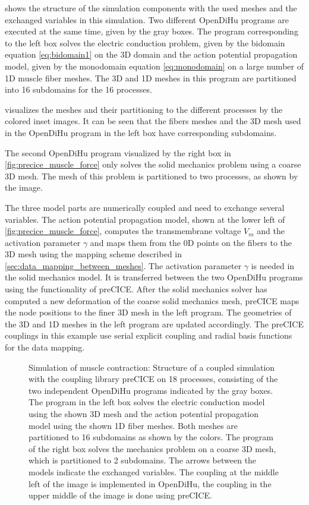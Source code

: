  shows the structure of the simulation components with the used meshes and the exchanged variables in this simulation. Two different OpenDiHu programs are executed at the same time, given by the gray boxes. The program corresponding to the left box solves the electric conduction problem, given by the bidomain equation \cref{eq:bidomain1} on the 3D domain and the action potential propagation model, given by the monodomain equation \cref{eq:monodomain} on a large number of 1D muscle fiber meshes. 
The 3D and 1D meshes in this program are partitioned into 16 subdomains for the 16 processes.

 visualizes the meshes and their partitioning to the different processes by the colored inset images. It can be seen that the fibers meshes and the 3D mesh used in the OpenDiHu program in the left box have corresponding subdomains.

The second OpenDiHu program visualized by the right box in \cref{fig:precice_muscle_force} only solves the solid mechanics problem using a coarse 3D mesh. The mesh of this problem is partitioned to two processes, as shown by the image. 

The three model parts are numerically coupled and need to exchange several variables. The action potential propagation model, shown at the lower left of \cref{fig:precice_muscle_force}, computes the transmembrane voltage $V_m$ and the activation parameter $\gamma$ and maps them from the 0D points on the fibers to the 3D mesh using the mapping scheme described in \cref{sec:data_mapping_between_meshes}. The activation parameter $\gamma$ is needed in the solid mechanics model. It is transferred between the two OpenDiHu programs using the functionality of preCICE. After the solid mechanics solver has computed a new deformation of the coarse solid mechanics mesh, preCICE maps the node positions to the finer 3D mesh in the left program. The geometries of the 3D and 1D meshes in the left program are updated accordingly.
The preCICE couplings in this example use serial explicit coupling and radial basis functions for the data mapping.

\begin{figure}
  \centering%
  \def\svgwidth{0.9\textwidth}
  \caption{Simulation of muscle contraction: Structure of a coupled simulation with the coupling library preCICE on 18 processes, consisting of the two independent OpenDiHu programs indicated by the gray boxes. The program in the left box solves the electric conduction model using the shown 3D mesh and the action potential propagation model using the shown 1D fiber meshes. Both meshes are partitioned to 16 subdomains as shown by the colors. The program of the right box solves the mechanics problem on a coarse 3D mesh, which is partitioned to 2 subdomains. The arrows between the models indicate the exchanged variables. The coupling at the middle left of the image is implemented in OpenDiHu, the coupling in the upper middle of the image is done using preCICE.}%
  \label{fig:precice_scheme1}%
\end{figure}


